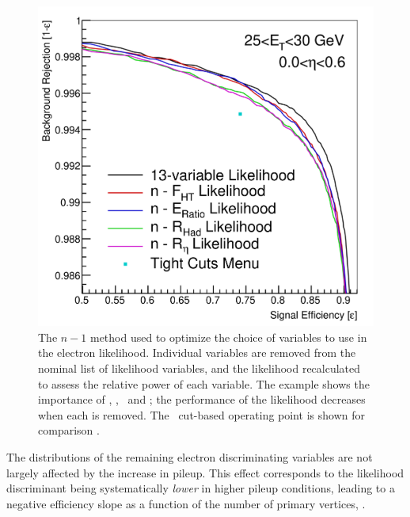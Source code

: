\begin{figure}[h]
\centering
\includegraphics[width=.80\textwidth]{figs/egamma/nminus1_plot.png}
\caption[Electron LH variables $n-1$ ROC curve showing signal efficiency/background rejection response of LH when single variables are removed from the LH.]{The $n-1$ method used to optimize the choice of variables to use in the electron likelihood.
Individual variables are removed from the nominal list of likelihood variables, and the likelihood recalculated to assess the relative power of each variable.
The example shows the importance of \TRTHighTHitsRatio, \deltaEmax, \rhad\ and \reta; the performance of the likelihood decreases when each is removed.
The \Tight ~cut-based operating point is shown for comparison \cite{Brendlinger:2228644}.}
\label{fig:egamma:nminusoneroccurve}
\end{figure}
The distributions of the remaining electron discriminating variables are not largely affected by the increase in pileup. %
This effect corresponds to the likelihood discriminant being systematically \emph{lower} in higher pileup conditions, leading to a negative efficiency slope as a function of the number of primary vertices, \nvtx.

